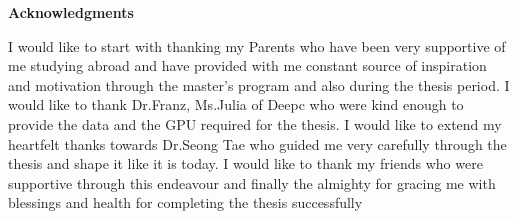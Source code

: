 \clearemptydoublepage
{}
{}

\vspace*{2cm}

\begin{center}
{\Large \textbf{Acknowledgments}}
\end{center}

\vspace{1cm}

\begin{center}
I would like to start with thanking my Parents who have been very supportive of me studying abroad and have provided with me constant source of inspiration and motivation through the master's program and also during the thesis period. I would like to thank Dr.Franz, Ms.Julia of Deepc who were kind enough to provide the data and the GPU required for the thesis. I would like to extend my heartfelt thanks towards Dr.Seong Tae who guided me very carefully through the thesis and shape it like it is today. I would like to thank my friends who were supportive through this endeavour and finally the almighty for gracing me with blessings and health for completing the thesis successfully
\end{center}
